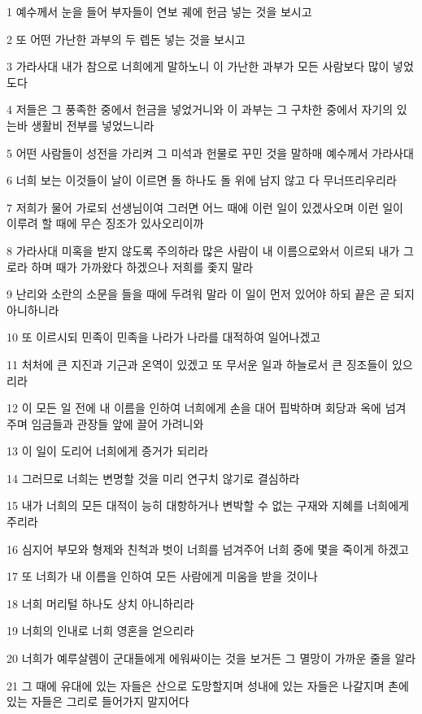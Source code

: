 \par 1 예수께서 눈을 들어 부자들이 연보 궤에 헌금 넣는 것을 보시고
\par 2 또 어떤 가난한 과부의 두 렙돈 넣는 것을 보시고
\par 3 가라사대 내가 참으로 너희에게 말하노니 이 가난한 과부가 모든 사람보다 많이 넣었도다
\par 4 저들은 그 풍족한 중에서 헌금을 넣었거니와 이 과부는 그 구차한 중에서 자기의 있는바 생활비 전부를 넣었느니라
\par 5 어떤 사람들이 성전을 가리켜 그 미석과 헌물로 꾸민 것을 말하매 예수께서 가라사대
\par 6 너희 보는 이것들이 날이 이르면 돌 하나도 돌 위에 남지 않고 다 무너뜨리우리라
\par 7 저희가 물어 가로되 선생님이여 그러면 어느 때에 이런 일이 있겠사오며 이런 일이 이루려 할 때에 무슨 징조가 있사오리이까
\par 8 가라사대 미혹을 받지 않도록 주의하라 많은 사람이 내 이름으로와서 이르되 내가 그로라 하며 때가 가까왔다 하겠으나 저희를 좇지 말라
\par 9 난리와 소란의 소문을 들을 때에 두려워 말라 이 일이 먼저 있어야 하되 끝은 곧 되지 아니하니라
\par 10 또 이르시되 민족이 민족을 나라가 나라를 대적하여 일어나겠고
\par 11 처처에 큰 지진과 기근과 온역이 있겠고 또 무서운 일과 하늘로서 큰 징조들이 있으리라
\par 12 이 모든 일 전에 내 이름을 인하여 너희에게 손을 대어 핍박하며 회당과 옥에 넘겨 주며 임금들과 관장들 앞에 끌어 가려니와
\par 13 이 일이 도리어 너희에게 증거가 되리라
\par 14 그러므로 너희는 변명할 것을 미리 연구치 않기로 결심하라
\par 15 내가 너희의 모든 대적이 능히 대항하거나 변박할 수 없는 구재와 지혜를 너희에게 주리라
\par 16 심지어 부모와 형제와 친척과 벗이 너희를 넘겨주어 너희 중에 몇을 죽이게 하겠고
\par 17 또 너희가 내 이름을 인하여 모든 사람에게 미움을 받을 것이나
\par 18 너희 머리털 하나도 상치 아니하리라
\par 19 너희의 인내로 너희 영혼을 얻으리라
\par 20 너희가 예루살렘이 군대들에게 에워싸이는 것을 보거든 그 멸망이 가까운 줄을 알라
\par 21 그 때에 유대에 있는 자들은 산으로 도망할지며 성내에 있는 자들은 나갈지며 촌에 있는 자들은 그리로 들어가지 말지어다
